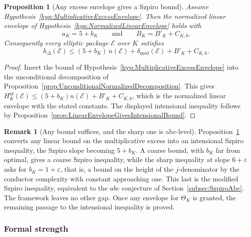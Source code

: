 \documentclass[10pt, reqno]{amsart}
\theoremstyle{plain}
\newtheorem{proposition}[theorem]{Proposition}
\theoremstyle{definition}
\newtheorem{remark}[theorem]{Remark}
\theoremstyle{plain}
\newcommand{\defect}{\delta_{\mathrm{mod}}}
\begin{document}
\begin{proposition}[Any excess envelope gives a Szpiro bound]
\label{prop:ExcessEnvelopeGivesNormalizedEnvelope}
Assume Hypothesis~\ref{hyp:MultiplicativeExcessEnvelope}. Then the normalized linear envelope of Hypothesis~\ref{hyp:NormalizedLinearEnvelope} holds with
\[
  a_{K}=5+b_{K}
  \qquad\text{and}\qquad
  B_{K}=B'_{K}+C_{K,6}.
\]
Consequently every elliptic package $\mathcal{E}$ over $K$ satisfies
\[
  h_{\Delta}(\mathcal{E})
  \le
  (5+b_{K})\,n(\mathcal{E})+\defect(\mathcal{E})+B'_{K}+C_{K,6}.
\]
\end{proposition}

\begin{proof}
Insert the bound of Hypothesis~\ref{hyp:MultiplicativeExcessEnvelope} into the unconditional decomposition of Proposition~\ref{prop:UnconditionalNormalizedDecomposition}. This gives $H^{\mathrm{nf}}_{K}(\mathcal{E})\le(5+b_{K})n(\mathcal{E})+B'_{K}+C_{K,6}$, which is the normalized linear envelope with the stated constants. The displayed intensional inequality follows by Proposition~\ref{prop:LinearEnvelopeGivesIntensionalBound}.
\end{proof}

\begin{remark}[Any bound suffices, and the sharp one is abc-level]
\label{rem:AnyBoundSuffices}
Proposition~\ref{prop:ExcessEnvelopeGivesNormalizedEnvelope} converts any linear bound on the multiplicative excess into an intensional Szpiro inequality, the Szpiro slope becoming $5+b_{K}$. A coarse bound, with $b_{K}$ far from optimal, gives a coarse Szpiro inequality, while the sharp inequality at slope $6+\varepsilon$ asks for $b_{K}=1+\varepsilon$, that is, a bound on the height of the $j$-denominator by the conductor complexity with constant approaching one. This last is the modified Szpiro inequality, equivalent to the $abc$ conjecture of Section~\ref{subsec:SzpiroAbc}. The framework leaves no other gap. Once any envelope for $\Theta_{K}$ is granted, the remaining passage to the intensional inequality is proved.
\end{remark}

\subsubsection{Formal strength}\label{subsubsec:PartialProfileACA0}
\end{document}
